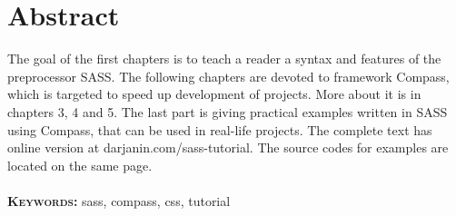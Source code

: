 \chapter*{Abstract}
The goal of the first chapters is to teach a reader a syntax and features of the preprocessor SASS. The following chapters are devoted to framework Compass, which is targeted to speed up development of projects. More about it is in chapters 3, 4 and 5. The last part is giving practical examples written in SASS using Compass, that can be used in real-life projects. The complete text has online version at darjanin.com/sass-tutorial. The source codes for examples are located on the same page.\\ \\
\textbf{\textsc{Keywords:}} sass, compass, css, tutorial
